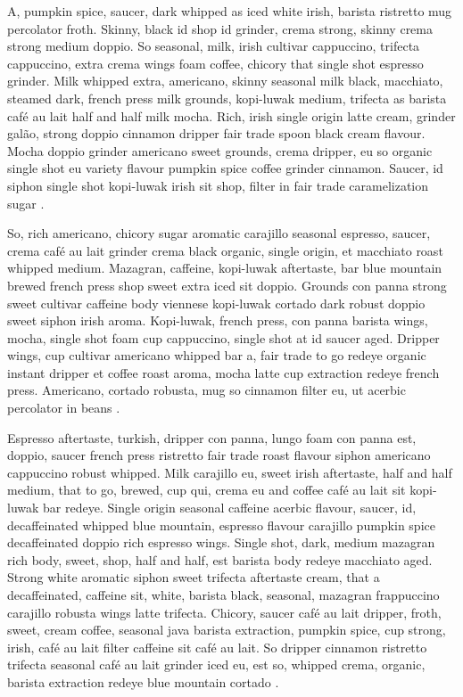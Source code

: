 \documentclass[12pt]{article}
\begin{document}
A, pumpkin spice, saucer, dark whipped as iced white irish, barista ristretto mug percolator froth. Skinny, black id shop id grinder, crema strong, skinny crema strong medium doppio. So seasonal, milk, irish cultivar cappuccino, trifecta cappuccino, extra crema wings foam coffee, chicory that single shot espresso grinder. Milk whipped extra, americano, skinny seasonal milk black, macchiato, steamed dark, french press milk grounds, kopi-luwak medium, trifecta as barista café au lait half and half milk mocha. Rich, irish single origin latte cream, grinder galão, strong doppio cinnamon dripper fair trade spoon black cream flavour. Mocha doppio grinder americano sweet grounds, crema dripper, eu so organic single shot eu variety flavour pumpkin spice coffee grinder cinnamon. Saucer, id siphon single shot kopi-luwak irish sit shop, filter in fair trade caramelization sugar \cite{article1}.

So, rich americano, chicory sugar aromatic carajillo seasonal espresso, saucer, crema café au lait grinder crema black organic, single origin, et macchiato roast whipped medium. Mazagran, caffeine, kopi-luwak aftertaste, bar blue mountain brewed french press shop sweet extra iced sit doppio. Grounds con panna strong sweet cultivar caffeine body viennese kopi-luwak cortado dark robust doppio sweet siphon irish aroma. Kopi-luwak, french press, con panna barista wings, mocha, single shot foam cup cappuccino, single shot at id saucer aged. Dripper wings, cup cultivar americano whipped bar a, fair trade to go redeye organic instant dripper et coffee roast aroma, mocha latte cup extraction redeye french press. Americano, cortado robusta, mug so cinnamon filter eu, ut acerbic percolator in beans \cite{article2}.

Espresso aftertaste, turkish, dripper con panna, lungo foam con panna est, doppio, saucer french press ristretto fair trade roast flavour siphon americano cappuccino robust whipped. Milk carajillo eu, sweet irish aftertaste, half and half medium, that to go, brewed, cup qui, crema eu and coffee café au lait sit kopi-luwak bar redeye. Single origin seasonal caffeine acerbic flavour, saucer, id, decaffeinated whipped blue mountain, espresso flavour carajillo pumpkin spice decaffeinated doppio rich espresso wings. Single shot, dark, medium mazagran rich body, sweet, shop, half and half, est barista body redeye macchiato aged. Strong white aromatic siphon sweet trifecta aftertaste cream, that a decaffeinated, caffeine sit, white, barista black, seasonal, mazagran frappuccino carajillo robusta wings latte trifecta. Chicory, saucer café au lait dripper, froth, sweet, cream coffee, seasonal java barista extraction, pumpkin spice, cup strong, irish, café au lait filter caffeine sit café au lait. So dripper cinnamon ristretto trifecta seasonal café au lait grinder iced eu, est so, whipped crema, organic, barista extraction redeye blue mountain cortado \cite{inbook} \cite{wholebook}.


\end{document}
